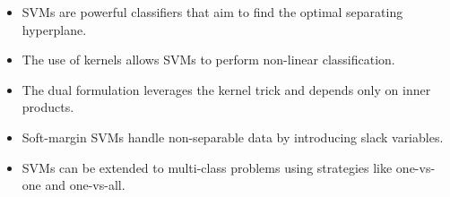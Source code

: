 \documentclass{article}
\begin{document}
\begin{itemize}
    \item SVMs are powerful classifiers that aim to find the optimal separating hyperplane.
    \item The use of kernels allows SVMs to perform non-linear classification.
    \item The dual formulation leverages the kernel trick and depends only on inner products.
    \item Soft-margin SVMs handle non-separable data by introducing slack variables.
    \item SVMs can be extended to multi-class problems using strategies like one-vs-one and one-vs-all.
\end{itemize}
\end{document}

